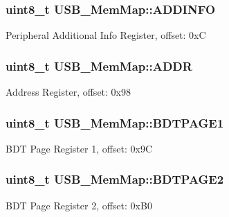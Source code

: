 \subsubsection[{A\+D\+D\+I\+N\+F\+O}]{\setlength{\rightskip}{0pt plus 5cm}uint8\+\_\+t U\+S\+B\+\_\+\+Mem\+Map\+::\+A\+D\+D\+I\+N\+F\+O}\label{struct_u_s_b___mem_map_aa87a73875ff45abb9b84992687f48000}
Peripheral Additional Info Register, offset\+: 0x\+C \hypertarget{struct_u_s_b___mem_map_a6b1fac9acdf7f6c7e0471af3886c6a8e}{}
\subsubsection[{A\+D\+D\+R}]{\setlength{\rightskip}{0pt plus 5cm}uint8\+\_\+t U\+S\+B\+\_\+\+Mem\+Map\+::\+A\+D\+D\+R}\label{struct_u_s_b___mem_map_a6b1fac9acdf7f6c7e0471af3886c6a8e}
Address Register, offset\+: 0x98 \hypertarget{struct_u_s_b___mem_map_ac61eff507f744f947ebf311e4d0a3767}{}
\subsubsection[{B\+D\+T\+P\+A\+G\+E1}]{\setlength{\rightskip}{0pt plus 5cm}uint8\+\_\+t U\+S\+B\+\_\+\+Mem\+Map\+::\+B\+D\+T\+P\+A\+G\+E1}\label{struct_u_s_b___mem_map_ac61eff507f744f947ebf311e4d0a3767}
B\+D\+T Page Register 1, offset\+: 0x9\+C \hypertarget{struct_u_s_b___mem_map_abb9113fced941f9af402d501dd6dc301}{}
\subsubsection[{B\+D\+T\+P\+A\+G\+E2}]{\setlength{\rightskip}{0pt plus 5cm}uint8\+\_\+t U\+S\+B\+\_\+\+Mem\+Map\+::\+B\+D\+T\+P\+A\+G\+E2}\label{struct_u_s_b___mem_map_abb9113fced941f9af402d501dd6dc301}
B\+D\+T Page Register 2, offset\+: 0x\+B0 \hypertarget{struct_u_s_b___mem_map_afd1f5b8867e36b32297641c5fe0b283b}{}
